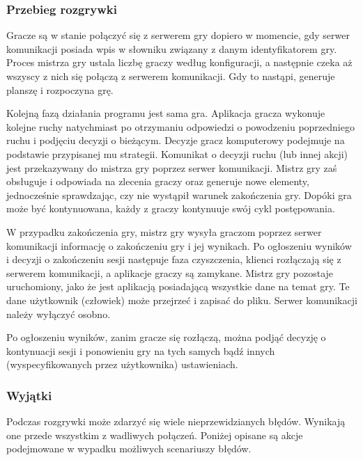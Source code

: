 \documentclass[11pt]{article}
\let\Oldsubsubsection\subsubsection
\renewcommand{\subsubsection}{\FloatBarrier\Oldsubsubsection}
\begin{document}
\subsubsection{Przebieg rozgrywki}
\par
Gracze są w stanie połączyć się z serwerem gry dopiero w momencie, gdy serwer komunikacji posiada wpis w słowniku związany z danym identyfikatorem gry. Proces mistrza gry ustala liczbę graczy według konfiguracji, a następnie czeka aż wszyscy z nich się połączą z serwerem komunikacji. Gdy to nastąpi, generuje planszę i rozpoczyna grę. 
\par
Kolejną fazą działania programu jest sama gra. Aplikacja gracza wykonuje kolejne ruchy natychmiast po otrzymaniu odpowiedzi o powodzeniu poprzedniego ruchu i podjęciu decyzji o bieżącym. Decyzje gracz komputerowy podejmuje na podstawie przypisanej mu strategii. Komunikat o decyzji ruchu (lub innej akcji) jest przekazywany do mistrza gry poprzez serwer komunikacji. Mistrz gry zaś obsługuje i odpowiada na zlecenia graczy oraz generuje nowe elementy, jednocześnie sprawdzając, czy nie wystąpił warunek zakończenia gry. Dopóki gra może być kontynuowana, każdy z graczy kontynuuje swój cykl postępowania.
\par
W przypadku zakończenia gry, mistrz gry wysyła graczom poprzez serwer komunikacji informację o zakończeniu gry i jej wynikach. Po ogłoszeniu wyników i decyzji o zakończeniu sesji następuje faza czyszczenia, klienci rozłączają się z serwerem komunikacji, a aplikacje graczy są zamykane. Mistrz gry pozostaje uruchomiony, jako że jest aplikacją posiadającą wszystkie dane na temat gry. Te dane użytkownik (człowiek) może przejrzeć i zapisać do pliku. Serwer komunikacji należy wyłączyć osobno.
\par
Po ogłoszeniu wyników, zanim gracze się rozłączą, można podjąć decyzję o kontynuacji sesji i ponowieniu gry na tych samych bądź innych (wyspecyfikowanych przez użytkownika) ustawieniach.



\subsubsection{Wyjątki}
\par
Podczas rozgrywki może zdarzyć się wiele nieprzewidzianych błędów. Wynikają one przede wszystkim z wadliwych połączeń. Poniżej opisane są akcje podejmowane w wypadku możliwych scenariuszy błędów.
\end{document}

